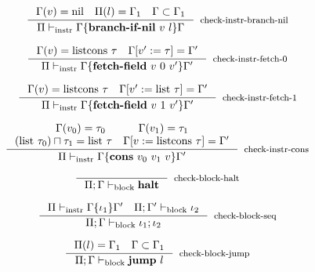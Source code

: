 \documentclass[sigconf]{acmart}
\theoremstyle{definition}
\begin{document}
\begin{equation}
\inference{\Gamma(v) = \text{nil}~~~\Pi(l) = \Gamma_1~~~\Gamma \subset \Gamma_1}
          {\Pi \vdash_{\text{instr}} \Gamma\{ \textbf{branch-if-nil}~v~l \}\Gamma}[check-instr-branch-nil]
\end{equation}

\begin{equation}
\inference{\Gamma(v) = \text{listcons}~\tau~~~\Gamma[v':=\tau]=\Gamma'}
          {\Pi \vdash_{\text{instr}} \Gamma\{ \textbf{fetch-field}~v~0~v' \}\Gamma'}[check-instr-fetch-0]
\end{equation}

\begin{equation}
\inference{\Gamma(v) = \text{listcons}~\tau~~~\Gamma[v':=\text{list}~\tau]=\Gamma'}
          {\Pi \vdash_{\text{instr}} \Gamma\{ \textbf{fetch-field}~v~1~v' \}\Gamma'}[check-instr-fetch-1]
\end{equation}

\begin{equation}
\inference{\Gamma(v_0) = \tau_0~~~~~~~~~\Gamma(v_1) = \tau_1 \\ (\text{list}~\tau_0) \sqcap \tau_1=\text{list}~\tau~~~\Gamma[v:=\text{listcons}~\tau]=\Gamma'}
          {\Pi \vdash_{\text{instr}} \Gamma\{ \textbf{cons}~v_0~v_1~v \}\Gamma'}[check-instr-cons]
\end{equation}


\begin{equation}
\inference{}
          {\Pi;\Gamma\vdash_{\text{block}} \textbf{halt}}[check-block-halt]
\end{equation}

\begin{equation}
\inference{\Pi\vdash_{\text{instr}} \Gamma\{\iota_1\}\Gamma'~~~\Pi;\Gamma'\vdash_{\text{block}} \iota_2}
          {\Pi;\Gamma\vdash_{\text{block}} \iota_1;\iota_2}[check-block-seq]
\end{equation}

\begin{equation}
\inference{\Pi(l)=\Gamma_1~~~\Gamma \subset \Gamma_1}
          {\Pi;\Gamma\vdash_{\text{block}} \textbf{jump}~l}[check-block-jump]
\end{equation}

\end{document}

